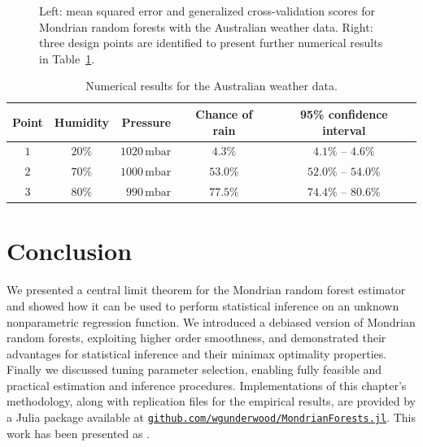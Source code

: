 \begin{figure}[ht]
\begin{subfigure}{0.49\textwidth}
  \end{subfigure}
  \caption{Left: mean squared error and generalized cross-validation scores
    for Mondrian random forests with the Australian weather data.
    Right: three design points are identified to present further numerical
  results in Table~\ref{tab:weather_ci}.}
  \label{fig:weather_gcv}
\end{figure}

\begin{table}[ht]
  \begin{center}
    \begin{tabular}{|c|c|r|c|c|}
      \hline
      Point & Humidity & Pressure &
      Chance of rain & 95\% confidence interval \\
      \hline
      $1$ & $20\%$ & $1020\,\textrm{mbar}$ &
      $4.3\%$ &
      $4.1\%$ -- $4.6\%$ \\
      $2$ & $70\%$ & $1000\,\textrm{mbar}$ &
      $53.0\%$ &
      $52.0\%$ -- $54.0\%$ \\
      $3$ & $80\%$ & $990\,\textrm{mbar}$ &
      $77.5\%$ &
      $74.4\%$ -- $80.6\%$ \\
      \hline
    \end{tabular}
  \end{center}
  \caption{Numerical results for the Australian weather data.}
  \label{tab:weather_ci}
\end{table}

\section{Conclusion}%
\label{sec:mondrian_conclusion}

We presented a central limit theorem for the Mondrian random forest
estimator and showed how it can be used to perform statistical inference
on an unknown nonparametric regression function.
We introduced a debiased version of Mondrian random forests, exploiting higher
order smoothness, and
demonstrated their advantages for statistical inference and their
minimax optimality properties.
Finally we discussed tuning parameter selection, enabling fully
feasible and practical estimation and inference procedures.
Implementations of this chapter's methodology,
along with replication files for the empirical results,
are provided by a Julia package available at
\href{https://github.com/WGUNDERWOOD/MondrianForests.jl}%
{\texttt{github.com/wgunderwood/MondrianForests.jl}}.
This work has been presented as
%
\cite{%
  underwood2024talkmichigan,%
  underwood2024talkillinois,%
  underwood2024talkpitt%
}.
